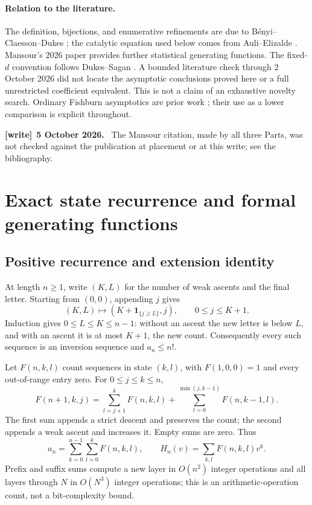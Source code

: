 \documentclass[11pt,a4paper]{article}
\theoremstyle{remark}\newtheorem{remark}[theorem]{Remark}
\newcommand{\ind}{\mathbf 1}\newcommand{\wasc}{\operatorname{wasc}}\newcommand{\dasc}{\operatorname{dasc}}
\numberwithin{equation}{section}
\newenvironment{writenote}[1][]{\par\smallskip\begingroup\small
 \noindent\textbf{[write]}\if\relax\detokenize{#1}\relax\else~\textbf{#1.}\fi\ }%
 {\par\endgroup\smallskip}
\begin{document}
\paragraph{Relation to the literature.}
The definition, bijections, and enumerative refinements are due to B\'enyi--Claesson--Dukes \cite{benyi}; the catalytic equation used below comes from Auli--Elizalde \cite{auli}. Mansour's 2026 paper \cite{mansour} provides further statistical generating functions. The fixed-$d$ convention follows Dukes--Sagan \cite{dukes}. A bounded literature check through 2 October 2026 did not locate the asymptotic conclusions proved here or a full unrestricted coefficient equivalent. This is not a claim of an exhaustive novelty search. Ordinary Fishburn asymptotics are prior work \cite{hwang}; their use as a lower comparison is explicit throughout.
\begin{writenote}[5 October 2026]
The Mansour citation, made by all three Parts, was not checked against the publication at placement or at this write; see the bibliography.
\end{writenote}

\section{Exact state recurrence and formal generating functions}\label{wasc:gr:sec:exact}
\subsection{Positive recurrence and extension identity}
At length $n\ge1$, write $(K,L)$ for the number of weak ascents and the final letter. Starting from $(0,0)$, appending $j$ gives
\begin{equation}\label{wasc:gr:eq:transition}
(K,L)\longmapsto(K+\ind_{\{j\ge L\}},j),\qquad 0\le j\le K+1.
\end{equation}
Induction gives $0\le L\le K\le n-1$: without an ascent the new letter is below $L$, and with an ascent it is at most $K+1$, the new count. Consequently every such sequence is an inversion sequence and $a_n\le n!$.

Let $F(n,k,l)$ count sequences in state $(k,l)$, with $F(1,0,0)=1$ and every out-of-range entry zero. For $0\le j\le k\le n$,
\begin{equation}\label{wasc:gr:eq:recurrence}
F(n+1,k,j)=\sum_{l=j+1}^{k}F(n,k,l)
+\sum_{l=0}^{\min(j,k-1)}F(n,k-1,l).
\end{equation}
The first sum appends a strict descent and preserves the count; the second appends a weak ascent and increases it. Empty sums are zero. Thus
\begin{equation}\label{wasc:gr:eq:sums}
a_n=\sum_{k=0}^{n-1}\sum_{l=0}^kF(n,k,l),\qquad
H_n(v)=\sum_{k,l}F(n,k,l)v^k.
\end{equation}
Prefix and suffix sums compute a new layer in $O(n^2)$ integer operations and all layers through $N$ in $O(N^3)$ integer operations; this is an arithmetic-operation count, not a bit-complexity bound.
\end{document}

